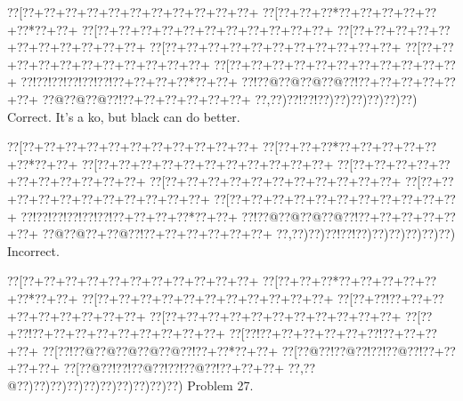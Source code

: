 \documentclass[a5paper]{article}
\begin{document}
\begin{center}
{\goo
\0??[\0??+\0??+\0??+\0??+\0??+\0??+\0??+\0??+\0??+\0??+\0??+
\0??[\0??+\0??+\0??*\0??+\0??+\0??+\0??+\0??+\0??*\0??+\0??+
\0??[\0??+\0??+\0??+\0??+\0??+\0??+\0??+\0??+\0??+\0??+\0??+
\0??[\0??+\0??+\0??+\0??+\0??+\0??+\0??+\0??+\0??+\0??+\0??+
\0??[\0??+\0??+\0??+\0??+\0??+\0??+\0??+\0??+\0??+\0??+\0??+
\0??[\0??+\0??+\0??+\0??+\0??+\0??+\0??+\0??+\0??+\0??+\0??+
\0??[\0??+\0??+\0??+\0??+\0??+\0??+\0??+\0??+\0??+\0??+\0??+
\0??!\0??!\0??!\0??!\0??!\0??!\0??+\0??+\0??+\0??*\0??+\0??+
\0??!\0??@\0??@\0??@\0??@\0??!\0??+\0??+\0??+\0??+\0??+\0??+
\0??@\0??@\0??@\0??!\0??+\0??+\0??+\0??+\0??+\0??+
\0??,\0??)\0??!\0??!\0??)\0??)\0??)\0??)\0??)\0??)
}
Correct. It's a ko, but black can do better.

\end{center}
\begin{center}
{\goo
\0??[\0??+\0??+\0??+\0??+\0??+\0??+\0??+\0??+\0??+\0??+\0??+
\0??[\0??+\0??+\0??*\0??+\0??+\0??+\0??+\0??+\0??*\0??+\0??+
\0??[\0??+\0??+\0??+\0??+\0??+\0??+\0??+\0??+\0??+\0??+\0??+
\0??[\0??+\0??+\0??+\0??+\0??+\0??+\0??+\0??+\0??+\0??+\0??+
\0??[\0??+\0??+\0??+\0??+\0??+\0??+\0??+\0??+\0??+\0??+\0??+
\0??[\0??+\0??+\0??+\0??+\0??+\0??+\0??+\0??+\0??+\0??+\0??+
\0??[\0??+\0??+\0??+\0??+\0??+\0??+\0??+\0??+\0??+\0??+\0??+
\0??!\0??!\0??!\0??!\0??!\0??!\0??+\0??+\0??+\0??*\0??+\0??+
\0??!\0??@\0??@\0??@\0??@\0??!\0??+\0??+\0??+\0??+\0??+\0??+
\0??@\0??@\0??+\0??@\0??!\0??+\0??+\0??+\0??+\0??+\0??+
\0??,\0??)\0??)\0??!\0??!\0??)\0??)\0??)\0??)\0??)\0??)
}
Incorrect. 

\end{center}
\newpage
\begin{center}
{\goo
\0??[\0??+\0??+\0??+\0??+\0??+\0??+\0??+\0??+\0??+\0??+\0??+
\0??[\0??+\0??+\0??*\0??+\0??+\0??+\0??+\0??+\0??*\0??+\0??+
\0??[\0??+\0??+\0??+\0??+\0??+\0??+\0??+\0??+\0??+\0??+\0??+
\0??[\0??+\0??!\0??+\0??+\0??+\0??+\0??+\0??+\0??+\0??+\0??+
\0??[\0??+\0??+\0??+\0??+\0??+\0??+\0??+\0??+\0??+\0??+\0??+
\0??[\0??+\0??!\0??+\0??+\0??+\0??+\0??+\0??+\0??+\0??+\0??+
\0??[\0??!\0??+\0??+\0??+\0??+\0??+\0??!\0??+\0??+\0??+\0??+
\0??[\0??!\0??@\0??@\0??@\0??@\0??@\0??!\0??+\0??*\0??+\0??+
\0??[\0??@\0??!\0??@\0??!\0??!\0??@\0??!\0??+\0??+\0??+\0??+
\0??[\0??@\0??!\0??!\0??@\0??!\0??!\0??@\0??!\0??+\0??+\0??+
\0??,\0??@\0??)\0??)\0??)\0??)\0??)\0??)\0??)\0??)\0??)\0??)
}
Problem 27.

\end{center}
\end{document}
